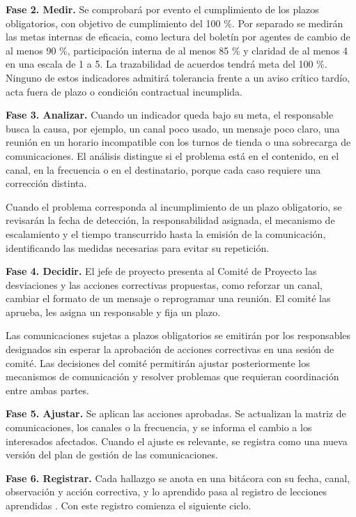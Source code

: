 \documentclass[11pt]{article}
\begin{document}
\textbf{Fase 2. Medir.} Se comprobará por evento el cumplimiento de los
plazos obligatorios, con objetivo de cumplimiento del 100 \%. Por
separado se medirán las metas internas de eficacia, como lectura del
boletín por agentes de cambio de al menos 90 \%, participación interna
de al menos 85 \% y claridad de al menos 4 en una escala de 1 a 5. La
trazabilidad de acuerdos tendrá meta del 100 \%. Ninguno de estos
indicadores admitirá tolerancia frente a un aviso crítico tardío, acta
fuera de plazo o condición contractual incumplida.

\textbf{Fase 3. Analizar.} Cuando un indicador queda bajo su meta, el
responsable busca la causa, por ejemplo, un canal poco usado, un mensaje
poco claro, una reunión en un horario incompatible con los turnos de
tienda o una sobrecarga de comunicaciones. El análisis distingue si el
problema está en el contenido, en el canal, en la frecuencia o en el
destinatario, porque cada caso requiere una corrección distinta.

Cuando el problema corresponda al incumplimiento de un plazo
obligatorio, se revisarán la fecha de detección, la responsabilidad
asignada, el mecanismo de escalamiento y el tiempo transcurrido hasta la
emisión de la comunicación, identificando las medidas necesarias para
evitar su repetición.

\textbf{Fase 4. Decidir.} El jefe de proyecto presenta al Comité de
Proyecto las desviaciones y las acciones correctivas propuestas, como
reforzar un canal, cambiar el formato de un mensaje o reprogramar una
reunión. El comité las aprueba, les asigna un responsable y fija un
plazo.

Las comunicaciones sujetas a plazos obligatorios se emitirán por los
responsables designados sin esperar la aprobación de acciones
correctivas en una sesión de comité. Las decisiones del comité
permitirán ajustar posteriormente los mecanismos de comunicación y
resolver problemas que requieran coordinación entre ambas partes.

\textbf{Fase 5. Ajustar.} Se aplican las acciones aprobadas. Se
actualizan la matriz de comunicaciones, los canales o la frecuencia, y
se informa el cambio a los interesados afectados. Cuando el ajuste es
relevante, se registra como una nueva versión del plan de gestión de las
comunicaciones.

\textbf{Fase 6. Registrar.} Cada hallazgo se anota en una bitácora con
su fecha, canal, observación y acción correctiva, y lo aprendido pasa al
registro de lecciones aprendidas . Con este registro comienza el
siguiente ciclo.
\end{document}
